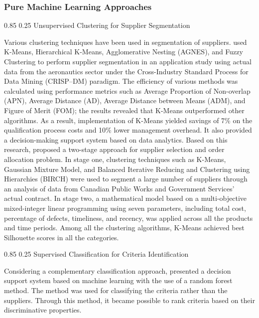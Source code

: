\documentclass[11pt]{article}
\makeatletter
\renewcommand\paragraph{\@startsection{paragraph}{4}{\z@}%
  {0.85\baselineskip}%
  {0.25\baselineskip}%
  {\normalfont\normalsize\bfseries}}
\makeatother
\begin{document}
\subsubsection{Pure Machine Learning Approaches}

\paragraph{Unsupervised Clustering for Supplier Segmentation}

Various clustering techniques have been used in segmentation of suppliers. \cite{ref40} used K-Means, Hierarchical K-Means, Agglomerative Nesting (AGNES), and Fuzzy Clustering to perform supplier segmentation in an application study using actual data from the aeronautics sector under the Cross-Industry Standard Process for Data Mining (CRISP--DM) paradigm. The efficiency of various methods was calculated using performance metrics such as Average Proportion of Non-overlap (APN), Average Distance (AD), Average Distance between Means (ADM), and Figure of Merit (FOM); the results revealed that K-Means outperformed other algorithms. As a result, implementation of K-Means yielded savings of 7\% on the qualification process costs and 10\% lower management overhead. It also provided a decision-making support system based on data analytics. Based on this research, \cite{ref39} proposed a two-stage approach for supplier selection and order allocation problem. In stage one, clustering techniques such as K-Means, Gaussian Mixture Model, and Balanced Iterative Reducing and Clustering using Hierarchies (BIRCH) were used to segment a large number of suppliers through an analysis of data from Canadian Public Works and Government Services' actual contract. In stage two, a mathematical model based on a multi-objective mixed-integer linear programming using seven parameters, including total cost, percentage of defects, timeliness, and recency, was applied across all the products and time periods. Among all the clustering algorithms, K-Means achieved best Silhouette scores in all the categories.

\paragraph{Supervised Classification for Criteria Identification}

Considering a complementary classification approach, \cite{ref38} presented a decision support system based on machine learning with the use of a random forest method. The method was used for classifying the criteria rather than the suppliers. Through this method, it became possible to rank criteria based on their discriminative properties.
\end{document}
